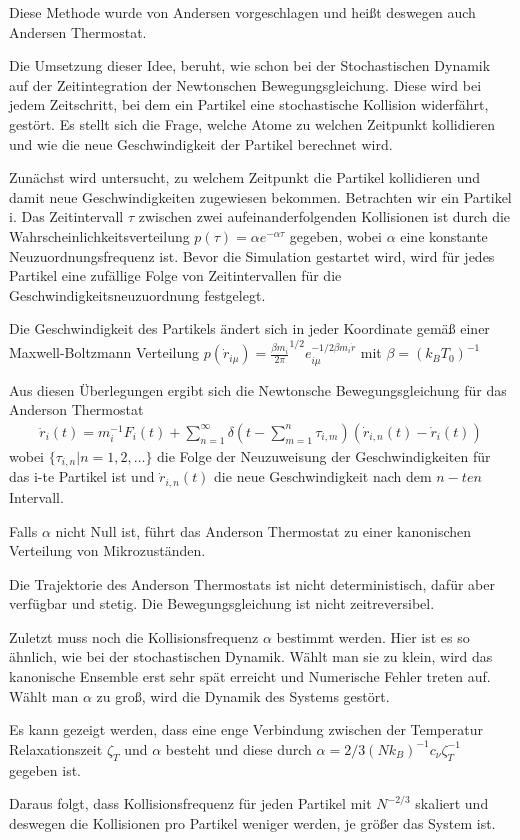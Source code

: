 \documentclass[]{article}
\begin{document}
Diese Methode wurde von Andersen vorgeschlagen und heißt deswegen auch Andersen Thermostat. 

Die Umsetzung dieser Idee, beruht, wie schon bei der Stochastischen Dynamik auf der Zeitintegration der Newtonschen Bewegungsgleichung. Diese wird bei jedem Zeitschritt, bei dem ein Partikel eine stochastische Kollision widerfährt,  gestört. Es stellt sich die Frage, welche Atome zu welchen Zeitpunkt kollidieren und wie die neue Geschwindigkeit der Partikel berechnet wird.  

Zunächst wird untersucht, zu welchem Zeitpunkt die Partikel kollidieren und damit neue Geschwindigkeiten zugewiesen bekommen. Betrachten wir ein Partikel i. Das Zeitintervall $\tau$ zwischen zwei aufeinanderfolgenden Kollisionen ist durch die Wahrscheinlichkeitsverteilung $p(\tau)= \alpha e^{- \alpha \tau}$ gegeben, wobei $\alpha$ eine konstante Neuzuordnungsfrequenz ist.
Bevor die Simulation gestartet wird, wird für jedes Partikel eine zufällige Folge von Zeitintervallen für die Geschwindigkeitsneuzuordnung festgelegt. 

Die Geschwindigkeit des Partikels ändert sich in jeder Koordinate gemäß einer Maxwell-Boltzmann Verteilung $p(\dot{r}_{i \mu}) = {\frac{\beta m_i}{2 \pi}}^{1/2} e^{-1/2 \beta m_i \dot{r}}_{i \mu}$ mit $\beta = (k_B T_0)^{-1}$
  
Aus diesen Überlegungen ergibt sich die Newtonsche Bewegungsgleichung für das Anderson Thermostat
\begin{align*}
	\ddot{r}_i(t) = m_i^{-1} F_i(t) + \sum\limits_{n=1}^{\infty} \delta \left(  t - \sum\limits_{m=1}^n \tau_{i,m}\right) \left( \dot{r}_{i,n}(t) - \dot{r}_i(t) \right)
\end{align*}  
wobei $\{\tau_{i,n}| n=1,2, \dots\}$ die Folge der Neuzuweisung der Geschwindigkeiten für das i-te Partikel ist und $\dot{r}_{i,n}(t)$ die neue Geschwindigkeit nach dem $n-ten$ Intervall.
 
Falls $\alpha $ nicht Null ist, führt das Anderson Thermostat zu einer kanonischen Verteilung von Mikrozuständen. 

Die Trajektorie des Anderson Thermostats ist nicht deterministisch, dafür aber verfügbar und stetig. Die Bewegungsgleichung ist nicht zeitreversibel.

Zuletzt muss noch die Kollisionsfrequenz $\alpha$ bestimmt werden. Hier ist es so ähnlich, wie bei der stochastischen Dynamik. Wählt man sie zu klein, wird das kanonische Ensemble erst sehr spät erreicht und Numerische Fehler treten auf. Wählt man $\alpha$ zu groß, wird die Dynamik des Systems gestört.

Es kann gezeigt werden, dass eine enge Verbindung zwischen der Temperatur Relaxationszeit $ \zeta_T$ und $\alpha$ besteht und diese durch $\alpha = 2/3 (N k_B)^{-1} c_{\nu} \zeta_T^{-1}$ gegeben ist. 

Daraus folgt, dass Kollisionsfrequenz für jeden Partikel mit $N^{-2/3}$ skaliert und deswegen die Kollisionen pro Partikel weniger werden, je größer das System ist. 

\end{document}
